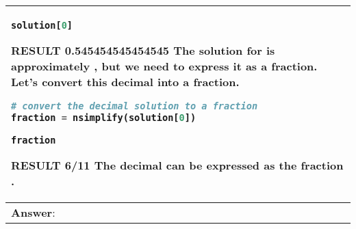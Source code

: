 \documentclass{article} \usepackage{iclr2023_conference,times}
\newcommand{\gptcode}{GPT4-Code}
\begin{document}
\begin{table*}[ht]
\begin{tabular}{p{}}
\begin{lstlisting}[language=Python]
solution[0]
     \end{lstlisting} 
     \textbf{RESULT}\newline
    \textbf{0.545454545454545}\newline
The solution for  is approximately , but we need to express it as a fraction. Let's convert this decimal into a fraction.
\lstset{style=mystyle}
     \begin{lstlisting}[language=Python]
# convert the decimal solution to a fraction
fraction = nsimplify(solution[0])

fraction
     \end{lstlisting} 
     \textbf{RESULT}\newline
    \textbf{6/11}\newline
The decimal  can be expressed as the fraction .

     \\
     \midrule

      \multicolumn{1}{p{0.90\textwidth}}{\small \textbf{Answer}:  }
\\
     \bottomrule
    \end{tabular}
    \caption{An example in which \gptcode~self-debugs when the code execution emits an error.}
    \label{tab:baseline_example1}
\end{table*}
\end{document}
